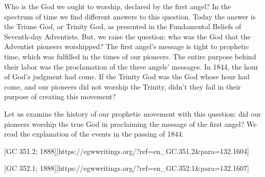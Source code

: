 Who is the God we ought to worship, declared by the first angel? In the spectrum of time we find different answers to this question. Today the answer is the Triune God, or Trinity God, as presented in the Fundamental Beliefs of Seventh-day Adventists. But, we raise the question: who was the God that the Adventist pioneers worshipped? The first angel’s message is tight to prophetic time, which was fulfilled in the times of our pioneers. The entire purpose behind their labor was the proclamation of the three angels’ messages. In 1844, the hour of God’s judgment had come. If the Trinity God was the God whose hour had come, and our pioneers did not worship the Trinity, didn’t they fail in their purpose of creating this movement?

Let us examine the history of our prophetic movement with this question: did our pioneers worship the true God in proclaiming the message of the first angel? We read the explanation of the events in the passing of 1844.

[GC 351.2; 1888][https://egwwritings.org/?ref=en\_GC.351.2&para=132.1604]

[GC 352.1; 1888][https://egwwritings.org/?ref=en\_GC.352.1&para=132.1607]


